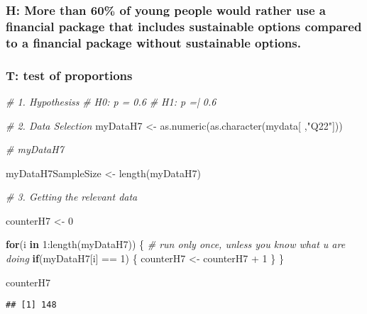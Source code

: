\documentclass[
]{article}
\newenvironment{Shaded}{\begin{snugshade}}{\end{snugshade}}
\newcommand{\CommentTok}[1]{\textcolor[rgb]{0.56,0.35,0.01}{\textit{#1}}}
\newcommand{\ControlFlowTok}[1]{\textcolor[rgb]{0.13,0.29,0.53}{\textbf{#1}}}
\newcommand{\DecValTok}[1]{\textcolor[rgb]{0.00,0.00,0.81}{#1}}
\newcommand{\FunctionTok}[1]{\textcolor[rgb]{0.00,0.00,0.00}{#1}}
\newcommand{\NormalTok}[1]{#1}
\newcommand{\OtherTok}[1]{\textcolor[rgb]{0.56,0.35,0.01}{#1}}
\newcommand{\SpecialCharTok}[1]{\textcolor[rgb]{0.00,0.00,0.00}{#1}}
\newcommand{\StringTok}[1]{\textcolor[rgb]{0.31,0.60,0.02}{#1}}
\begin{document}
\hypertarget{h-more-than-60-of-young-people-would-rather-use-a-financial-package-that-includes-sustainable-options-compared-to-a-financial-package-without-sustainable-options.}{%
\subsubsection{H: More than 60\% of young people would rather use a
financial package that includes sustainable options compared to a
financial package without sustainable
options.}\label{h-more-than-60-of-young-people-would-rather-use-a-financial-package-that-includes-sustainable-options-compared-to-a-financial-package-without-sustainable-options.}}

\hypertarget{t-test-of-proportions-2}{%
\subsubsection{T: test of proportions}\label{t-test-of-proportions-2}}

\begin{Shaded}
\begin{Highlighting}[]
\CommentTok{\# 1. Hypothesis\textquotesingle{}s}
\CommentTok{\# H0: p = 0.6}
\CommentTok{\# H1: p =| 0.6}

\CommentTok{\# 2. Data Selection}
\NormalTok{myDataH7 }\OtherTok{\textless{}{-}} \FunctionTok{as.numeric}\NormalTok{(}\FunctionTok{as.character}\NormalTok{(mydata[ ,}\StringTok{"Q22"}\NormalTok{]))}

\CommentTok{\# myDataH7}

\NormalTok{myDataH7SampleSize }\OtherTok{\textless{}{-}} \FunctionTok{length}\NormalTok{(myDataH7)}

\CommentTok{\# 3. Getting the relevant data}

\NormalTok{counterH7 }\OtherTok{\textless{}{-}} \DecValTok{0}

\ControlFlowTok{for}\NormalTok{(i }\ControlFlowTok{in} \DecValTok{1}\SpecialCharTok{:}\FunctionTok{length}\NormalTok{(myDataH7)) \{ }\CommentTok{\# run only once, unless you know what u are doing}
  \ControlFlowTok{if}\NormalTok{(myDataH7[i] }\SpecialCharTok{==} \DecValTok{1}\NormalTok{) \{}
\NormalTok{    counterH7 }\OtherTok{\textless{}{-}}\NormalTok{ counterH7 }\SpecialCharTok{+} \DecValTok{1}
\NormalTok{  \}}
\NormalTok{\}}

\NormalTok{counterH7}
\end{Highlighting}
\end{Shaded}

\begin{verbatim}
## [1] 148
\end{verbatim}
\end{document}
